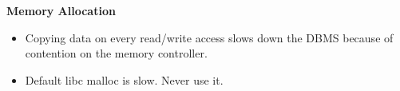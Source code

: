 \documentclass[11pt]{article}
\begin{document}
\textbf{Memory Allocation}
\begin{itemize}
    \item
    Copying data on every read/write access slows down the DBMS because of contention on the memory 
    controller.
    
    \item
    Default libc malloc is slow. Never use it.
\end{itemize}
    
 
% 
%         

\newpage


\end{document}

